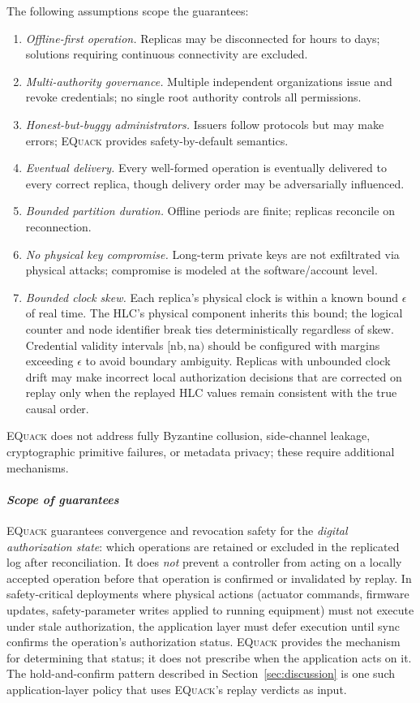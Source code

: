 \documentclass[10pt,journal,compsoc]{IEEEtran}
\newcommand{\equack}{\textsc{EQuack}}
\begin{document}
The following assumptions scope the guarantees:
\begin{enumerate}
    \item \textit{Offline-first operation.} Replicas may be disconnected for hours to days; solutions requiring continuous connectivity are excluded.
    \item \textit{Multi-authority governance.} Multiple independent organizations issue and revoke credentials; no single root authority controls all permissions.
    \item \textit{Honest-but-buggy administrators.} Issuers follow protocols but may make errors; \equack{} provides safety-by-default semantics.
    \item \textit{Eventual delivery.} Every well-formed operation is eventually delivered to every correct replica, though delivery order may be adversarially influenced.
    \item \textit{Bounded partition duration.} Offline periods are finite; replicas reconcile on reconnection.
    \item \textit{No physical key compromise.} Long-term private keys are not exfiltrated via physical attacks; compromise is modeled at the software/account level.
    \item \textit{Bounded clock skew.} Each replica's physical clock is within a known bound $\epsilon$ of real time. The HLC's physical component inherits this bound; the logical counter and node identifier break ties deterministically regardless of skew. Credential validity intervals $[\mathrm{nb}, \mathrm{na})$ should be configured with margins exceeding $\epsilon$ to avoid boundary ambiguity. Replicas with unbounded clock drift may make incorrect local authorization decisions that are corrected on replay only when the replayed HLC values remain consistent with the true causal order.
\end{enumerate}
\equack{} does not address fully Byzantine collusion, side-channel leakage, cryptographic primitive failures, or metadata privacy; these require additional mechanisms.

\paragraph*{\textit{Scope of guarantees}} \equack{} guarantees convergence and revocation safety for the \emph{digital authorization state}: which operations are retained or excluded in the replicated log after reconciliation. It does \emph{not} prevent a controller from acting on a locally accepted operation before that operation is confirmed or invalidated by replay. In safety-critical deployments where physical actions (actuator commands, firmware updates, safety-parameter writes applied to running equipment) must not execute under stale authorization, the application layer must defer execution until sync confirms the operation's authorization status. \equack{} provides the mechanism for determining that status; it does not prescribe when the application acts on it. The hold-and-confirm pattern described in Section~\ref{sec:discussion} is one such application-layer policy that uses \equack{}'s replay verdicts as input.
\end{document}
